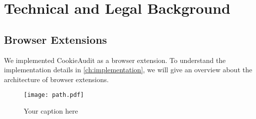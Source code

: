 \chapter{Technical and Legal Background}

\section{Browser Extensions}
We implemented CookieAudit as a browser extension.
To understand the implementation details in \cref{ch:implementation}, we will give an overview about the architecture of browser extensions.

\begin{figure}[h]
    \centering
    \texttt{[image: path.pdf]}
    \caption{Your caption here}
    \label{fig:your-label}
\end{figure}